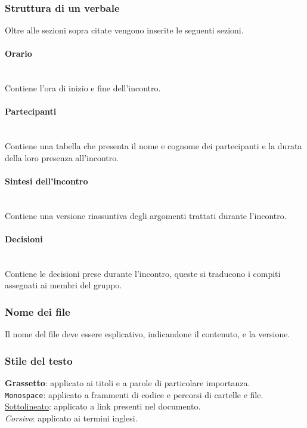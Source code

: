 \documentclass{article}
\begin{document}
\subsubsection{Struttura di un verbale}
Oltre alle sezioni sopra citate vengono inserite le seguenti sezioni.

\paragraph{Orario}~\\
Contiene l'ora di inizio e fine dell'incontro.

\paragraph{Partecipanti}~\\
Contiene una tabella che presenta il nome e cognome dei partecipanti e la durata della loro presenza all'incontro.

\paragraph{Sintesi dell'incontro}~\\
Contiene una versione riassuntiva degli argomenti trattati durante l'incontro.

\paragraph{Decisioni}~\\
Contiene le decisioni prese durante l'incontro, queste si traducono i compiti assegnati ai membri del gruppo.

\subsubsection{Nome dei file}
Il nome del file deve essere esplicativo, indicandone il contenuto, e la versione.

\subsubsection{Stile del testo}
\textbf{Grassetto}: applicato ai titoli e a parole di particolare importanza. \\
\texttt{Monospace}: applicato a frammenti di codice e percorsi di cartelle e file. \\
\underline{Sottolineato}: applicato a link presenti nel documento.\\
\textit{Corsivo}: applicato ai termini inglesi.
\end{document}
